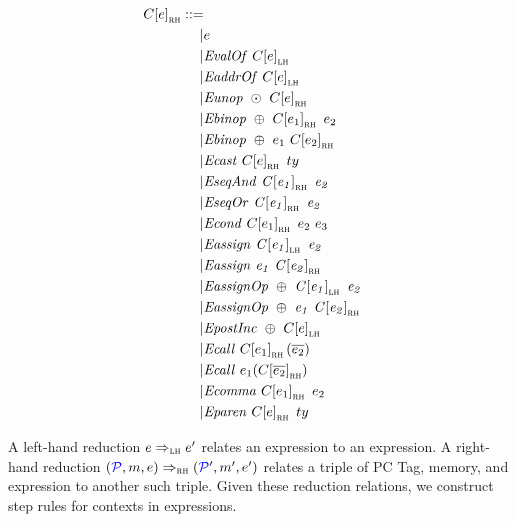 \documentclass{llncs}
\begin{document}
\[\begin{aligned}
\ctx{\expr}_\rh ::= \\
| & \expr & \\ %
| & \valof{\ctx{\expr}_\lh} \\ %
| & \addrof{\ctx{\expr}_\lh} \\ %
| & \unop{\odot}{\ctx{\expr}_\rh} \\ %
| & \binop{\oplus}{\ctx{\expr_1}_\rh}{\expr_2} \\ %
| & \binop{\oplus}{\expr_1}{\ctx{\expr_2}_\rh} \\ %
| & \cast{\ctx{\expr}_\rh}{\type} \\ %
| & \seqand{\ctx{\expr_1}_\rh}{\expr_2} \\ %
| & \seqor{\ctx{\expr_1}_\rh}{\expr_2} \\ %
| & \condition{\ctx{\expr_1}_\rh}{\expr_2}{\expr_3} \\ %
| & \assign{\ctx{\expr_1}_\lh}{\expr_2} \\ %
| & \assign{\expr_1}{\ctx{\expr_2}_\rh} \\ %
| & \assignop{\oplus}{\ctx{\expr_1}_\lh}{\expr_2} \\ %
| & \assignop{\oplus}{\expr_1}{\ctx{\expr_2}_\rh} \\ %
| & \postinc{\oplus}{\ctx{\expr}_\lh} \\ %
| & \call{\ctx{\expr_1}_\rh}{\overline{\expr_2}} \\ %
| & \call{\expr_1}{\ctx{\overline{\expr_2}}_\rh} \\ %
| & \comma{\ctx{\expr_1}_\rh}{\expr_2} \\ %
| & \paren{\ctx{\expr}_\rh}{\type}{} \\ %
\end{aligned}\]

A left-hand reduction \(e \Rightarrow_{\textnormal{\sc lh}} e'\)
relates an expression to an expression. A right-hand reduction
\((\mathcal{\color{blue} P\mathit{}},m,e) \Rightarrow_{\textnormal{\sc rh}} (\mathcal{\color{blue} P\mathit{}}',m',e')\)
relates a triple of PC Tag, memory, and expression to another such triple.
Given these reduction relations, we construct step rules for contexts in
expressions.

\end{document}
